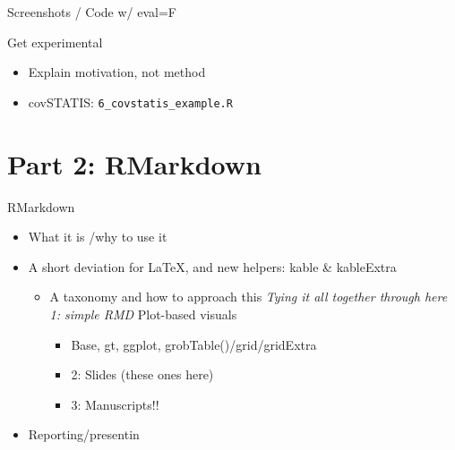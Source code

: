 \documentclass[
  ignorenonframetext,
]{beamer}
\providecommand{\tightlist}{%
  \setlength{\itemsep}{0pt}\setlength{\parskip}{0pt}}
\begin{document}
\begin{frame}{Screenshots / Code w/ eval=F}
\protect\hypertarget{screenshots-code-w-evalf}{}

\end{frame}

\begin{frame}[fragile]{Get experimental}
\protect\hypertarget{get-experimental}{}

\begin{itemize}
\tightlist
\item
  Explain motivation, not method
\item
  covSTATIS: \texttt{6\_covstatis\_example.R}
\end{itemize}

\end{frame}

\hypertarget{part-2-rmarkdown}{%
\section{Part 2: RMarkdown}\label{part-2-rmarkdown}}

\begin{frame}{RMarkdown}
\protect\hypertarget{rmarkdown}{}

\begin{itemize}
\tightlist
\item
  What it is /why to use it
\item
  A short deviation for LaTeX, and new helpers: kable \& kableExtra

  \begin{itemize}
  \tightlist
  \item
    A taxonomy and how to approach this \emph{Tying it all together
    through here 1: simple RMD }Plot-based visuals

    \begin{itemize}
    \tightlist
    \item
      Base, gt, ggplot, grobTable()/grid/gridExtra
    \item
      2: Slides (these ones here)
    \item
      3: Manuscripts!!
    \end{itemize}
  \end{itemize}
\item
  Reporting/presentin
\end{itemize}

\end{frame}
\end{document}
